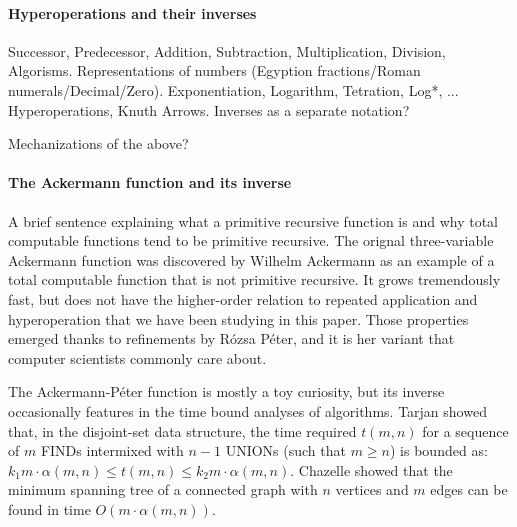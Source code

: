 \label{sec:related}

\paragraph*{Hyperoperations and their inverses}
Successor, Predecessor, Addition, Subtraction, Multiplication, Division, Algorisms.  Representations of numbers (Egyption fractions/Roman numerals/Decimal/Zero).  Exponentiation, Logarithm, Tetration, Log*, ...   Hyperoperations, Knuth Arrows.  Inverses as a separate notation?

Mechanizations of the above?


\paragraph*{The Ackermann function and its inverse}
{\color{magenta}A brief sentence explaining what a primitive recursive function is and 
why total computable functions tend to be primitive recursive.}
The orignal three-variable Ackermann function was discovered by 
Wilhelm Ackermann as an example of a total computable function that 
is not primitive recursive. It grows tremendously fast, but does not have the higher-order
relation to repeated application and hyperoperation that we have been studying in
this paper. Those properties emerged thanks to refinements by Rózsa Péter, and it is 
her variant that computer scientists commonly care about.

The Ackermann-Péter function is mostly a toy curiosity, but its inverse 
occasionally features in the time bound analyses of algorithms. 
Tarjan \cite{tarjan} showed that, in the disjoint-set data structure, 
the time required $t(m,n)$ for a sequence of $m$ \textsc{\color{magenta}FIND}s
intermixed with $n-1$ \textsc{\color{magenta}UNION}s (such that $m \geq n$) is bounded
as: $k_{1}m\cdot\alpha(m,n) \leq t(m,n) \leq k_{2}m\cdot\alpha(m,n)$. 
Chazelle \cite{chazelle} showed that the minimum spanning tree
of a connected graph with $n$ vertices and $m$ edges 
can be found in time $O(m\cdot\alpha(m,n))$.

